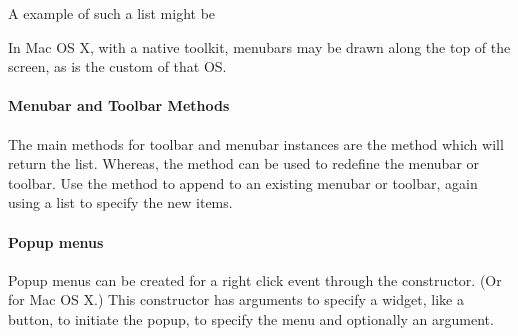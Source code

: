 A example of such a list might be
\begin{Schunk}
\end{Schunk}



In Mac OS X, with a native toolkit, menubars may be drawn along the top
of the screen, as is the custom of that OS. 

\paragraph{Menubar and Toolbar Methods}
The main methods for toolbar and menubar instances are
the  method which will return the list. Whereas, the
 method can be used to redefine the
menubar or toolbar. Use the  method to append to an
existing menubar or toolbar, again using a list to specify the new items.



\paragraph{Popup menus}

Popup menus can be created for a right click event through the
 constructor. (Or
 for Mac OS X.) This constructor has arguments
 to specify a widget, like a button, to initiate the popup,
 to specify the menu and optionally an
 argument.



